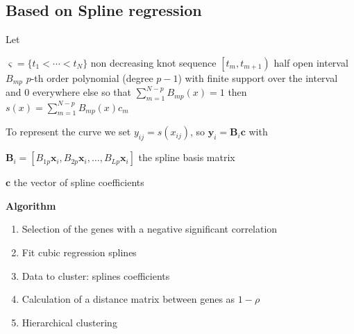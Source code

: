 
\subsection{Based on Spline regression}



Let 

 $\varsigma=\lbrace t_1 < \cdots < t_N \rbrace$ non decreasing  knot sequence 
 $\left[ t_m,t_{m+1} \right)$ half open interval
 $B_{mp}$ $p$-th order polynomial (degree $p-1$) with finite support over the interval and 0 everywhere else so that  $\sum_{m=1}^{N-p}B_{mp}(x)=1$
 then  $s(x)=\sum_{m=1}^{N-p}B_{mp}(x)c_m$ 


To represent the curve we set $y_{ij}=s(x_{ij})$, so $\mathbf{y}_i=\mathbf{B}_i\mathbf{c}$
with
\begin{description}
\item $\mathbf{B}_i =\left[ B_{1p}\mathbf{x}_i,B_{2p}\mathbf{x}_i,\dots,B_{Lp}\mathbf{x}_i \right]$ the spline basis matrix 
\item $\mathbf{c}$ the vector of spline coefficients
\end{description}

\textbf{Algorithm}
\begin {enumerate}
\item Selection of the genes with a negative significant correlation
\item Fit cubic regression splines
\item Data to cluster: splines coefficients
\item Calculation of a distance matrix between genes as $1-\rho$
\item Hierarchical clustering 
\end{enumerate}

